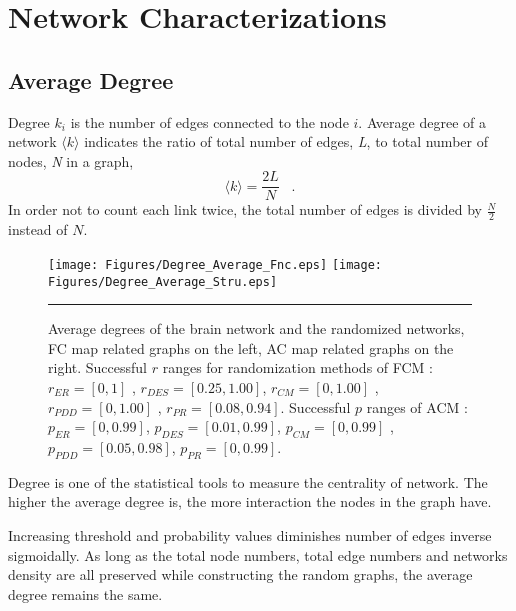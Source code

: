 
\chapter{Network Characterizations} %

\label{AppendixB} %


\section{Average Degree}

Degree $k_i$ is the number of edges connected to the node $i$. Average degree of a network $\langle k \rangle$ indicates the ratio of total number of edges, \textit{L}, to total number of nodes, \textit{N} in a graph,
\begin{equation}
\langle k \rangle = \frac{2L}{N} \;\;\;.
\end{equation} 
In order not to count each link twice, the total number of edges is divided by $\frac{N}{2}$ instead of $N$. 
 \begin{figure}[htbp]
 
  \centering
	 \texttt{[image: Figures/Degree\_Average\_Fnc.eps]}
	 \texttt{[image: Figures/Degree\_Average\_Stru.eps]}
	\rule{35em}{0.5pt}	  
  \caption[Average Degree]{Average degrees of the brain network and the randomized networks, FC map related graphs on the left, AC map related graphs on the right. Successful $r$ ranges for randomization methods of FCM :  $r_{ER}=[0,1]$ , $r_{DES} = [0.25,1.00]$, $r_{CM} = [0,1.00]$ , $r_{PDD} = [0,1.00]$ , $r_{PR} = [0.08,0.94]$. Successful $p$ ranges of ACM : $p_{ER}=[0,0.99]$, $p_{DES}=[0.01 , 0.99]$, $p_{CM}=[0, 0.99]$ , $p_{PDD}=[0.05 , 0.98]$, $p_{PR} = [0,0.99]$.} 
    \label{fig:Average Degree}
 	
\end{figure}  


Degree is one of the statistical tools to measure the centrality of network. The higher the average degree is, the more interaction the nodes in the graph have. 

Increasing threshold and probability values diminishes number of edges inverse sigmoidally. As long as the total node numbers, total edge numbers and networks density are all preserved while constructing the random graphs, the average degree remains the same. 

